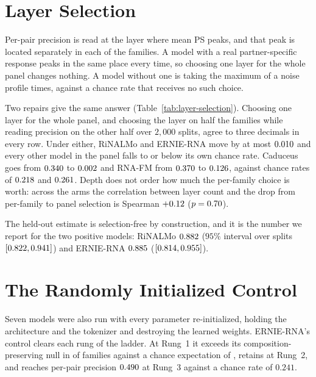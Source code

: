 \documentclass{article}
\begin{document}
\section{Layer Selection}
\label{sec:selection}

Per-pair precision is read at the layer where mean PS peaks, and that peak is
located separately in each of the \chanceRateN{} families. A model with a real
partner-specific response peaks in the same place every time, so choosing one
layer for the whole panel changes nothing. A model without one is taking the
maximum of a noise profile \chanceRateN{} times, against a chance rate that
receives no such choice.



Two repairs give the same answer (Table~\ref{tab:layer-selection}). Choosing one
layer for the whole panel, and choosing the layer on half the families while
reading precision on the other half over $2{,}000$ splits, agree to three
decimals in every row. Under either, RiNALMo and ERNIE-RNA move by at most
$0.010{}$ and every other model in the panel falls to or below its own chance
rate. Caduceus goes from $0.340{}$ to $0.002{}$
and RNA-FM from $0.370{}$ to $0.126{}$, against chance
rates of $0.218{}$ and $0.261{}$. Depth does not order
how much the per-family choice is worth: across the \selectionArms{} arms the
correlation between layer count and the drop from per-family to panel selection
is Spearman $+0.12{}$ ($p = 0.70{}$).

The held-out estimate is selection-free by construction, and it is the number we
report for the two positive models: RiNALMo $0.882{}$ ($95\%$
interval over splits $[0.822, 0.941]{}$) and ERNIE-RNA
$0.885{}$ ($[0.814, 0.955]{}$).

\section{The Randomly Initialized Control}
\label{sec:random-init}

Seven models were also run with every parameter re-initialized, holding the
architecture and the tokenizer and destroying the learned weights. ERNIE-RNA's
control clears each rung of the ladder. At Rung~1 it exceeds its
composition-preserving null in \exceedUntrainedErnieRNA{} of \panelN{} families
against a chance expectation of \expectedFalsePositives{}, retains
\retainUntrainedErnieRNA{} at Rung~2, and reaches per-pair precision
$0.490{}$ at
Rung~3 against a chance rate of $0.241$.
\end{document}
